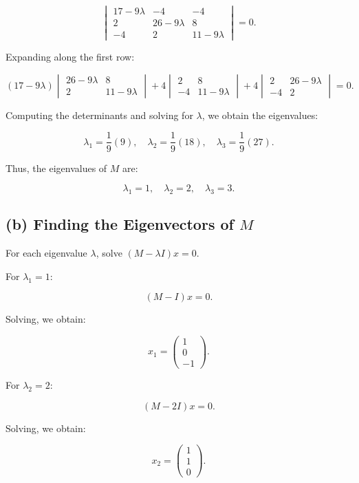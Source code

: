 \documentclass[12pt]{article}
\begin{document}
\[
\begin{vmatrix}
17 - 9\lambda & -4 & -4 \\
2 & 26 - 9\lambda & 8 \\
-4 & 2 & 11 - 9\lambda
\end{vmatrix} = 0.
\]

Expanding along the first row:

\[
(17 - 9\lambda) \begin{vmatrix} 26 - 9\lambda & 8 \\ 2 & 11 - 9\lambda \end{vmatrix}
+ 4 \begin{vmatrix} 2 & 8 \\ -4 & 11 - 9\lambda \end{vmatrix}
+ 4 \begin{vmatrix} 2 & 26 - 9\lambda \\ -4 & 2 \end{vmatrix} = 0.
\]

Computing the determinants and solving for \( \lambda \), we obtain the eigenvalues:

\[
\lambda_1 = \frac{1}{9}(9), \quad \lambda_2 = \frac{1}{9}(18), \quad \lambda_3 = \frac{1}{9}(27).
\]

Thus, the eigenvalues of \( M \) are:

\[
\lambda_1 = 1, \quad \lambda_2 = 2, \quad \lambda_3 = 3.
\]





\subsection*{(b) Finding the Eigenvectors of \( M \)}

For each eigenvalue \( \lambda \), solve \( (M - \lambda I)x = 0 \).

For \( \lambda_1 = 1 \):

\[
(M - I)x = 0.
\]

Solving, we obtain:

\[
x_1 =
\begin{pmatrix}
1 \\ 0 \\ -1
\end{pmatrix}.
\]

For \( \lambda_2 = 2 \):

\[
(M - 2I)x = 0.
\]

Solving, we obtain:

\[
x_2 =
\begin{pmatrix}
1 \\ 1 \\ 0
\end{pmatrix}.
\]
\end{document}
